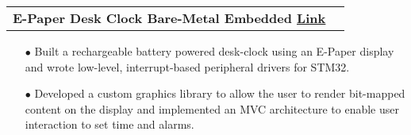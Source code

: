 \documentclass[11pt]{article}
\makeatletter
\newcommand{\resumeSubheadingP}[2]{
  \vspace{-2pt}\item
    \begin{tabular*}{1.0\textwidth}[t]{l@{\extracolsep{\fill}}r}
       \textbf{{\large #1}}&{#2} \\
    \end{tabular*}\vspace{-1pt}
}
\makeatother
\begin{document}
%
%

\resumeSubheadingP
{E-Paper Desk Clock \textbar{ } Bare-Metal Embedded \href{https://github.com/parthkharade/Eink-DeskClock}{\small{\textbar{ }\underline{Link} }}}{}
\begin{itemize}[leftmargin=0.3in]\setlength{\itemsep}{0pt}\setlength{\parskip}{0pt}\vspace{-0.2cm}
  \item[$\bullet$] Built a rechargeable battery powered desk-clock using an E-Paper display and wrote low-level, interrupt-based peripheral drivers for STM32. 
  \item[$\bullet$] Developed a custom graphics library to allow the user to render bit-mapped content on the display and implemented an MVC architecture to enable user interaction to set time and alarms.
\end{itemize}
\vspace{-0.2cm}
\end{document}
